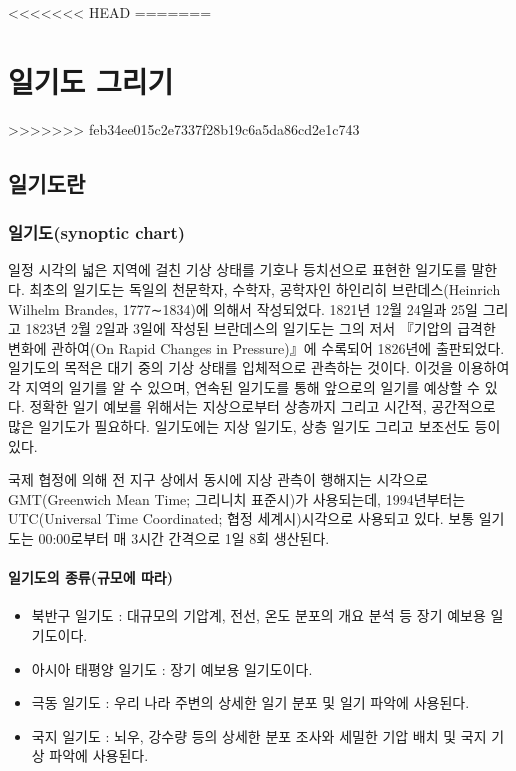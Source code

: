 <<<<<<< HEAD
=======
\chapter{일기도 그리기}
>>>>>>> feb34ee015c2e7337f28b19c6a5da86cd2e1c743

\section{일기도란}

\subsection{일기도(synoptic chart)}

일정 시각의 넓은 지역에 걸친 기상 상태를 기호나 등치선으로 표현한 일기도를 말한다. 최초의 일기도는 독일의 천문학자, 수학자, 공학자인 하인리히 브란데스(Heinrich Wilhelm Brandes, 1777∼1834)에 의해서 작성되었다. 1821년 12월 24일과 25일 그리고 1823년 2월 2일과 3일에 작성된 브란데스의 일기도는 그의 저서 『기압의 급격한 변화에 관하여(On Rapid Changes in Pressure)』에 수록되어 1826년에 출판되었다.
일기도의 목적은 대기 중의 기상 상태를 입체적으로 관측하는 것이다. 이것을 이용하여 각 지역의 일기를 알 수 있으며, 연속된 일기도를 통해 앞으로의 일기를 예상할 수 있다. 정확한 일기 예보를 위해서는 지상으로부터 상층까지 그리고 시간적, 공간적으로 많은 일기도가 필요하다. 일기도에는 지상 일기도, 상층 일기도 그리고 보조선도 등이 있다.

국제 협정에 의해 전 지구 상에서 동시에 지상 관측이 행해지는 시각으로 GMT(Greenwich Mean Time; 그리니치 표준시)가 사용되는데, 1994년부터는 UTC(Universal Time Coordinated; 협정 세계시)시각으로 사용되고 있다. 보통 일기도는 00:00로부터 매 3시간 간격으로 1일 8회 생산된다.


\subsubsection{일기도의 종류(규모에 따라)}

\begin{itemize}
	\item 북반구 일기도 : 대규모의 기압계, 전선, 온도 분포의 개요 분석 등 장기 예보용 일기도이다.
	\item 아시아 태평양 일기도 : 장기 예보용 일기도이다.
	\item 극동 일기도 : 우리 나라 주변의 상세한 일기 분포 및 일기 파악에 사용된다.
	\item 국지 일기도 : 뇌우, 강수량 등의 상세한 분포 조사와 세밀한 기압 배치 및 국지 기상 파악에 사용된다.
\end{itemize}

